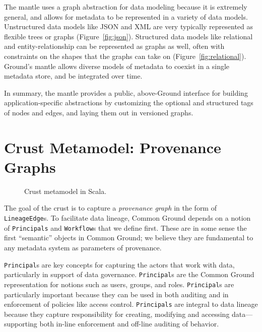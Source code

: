 \documentclass{article}
\newcommand{\mantle}{mantle\xspace}
\newcommand{\crust}{crust\xspace}
\newcommand{\Crust}{Crust\xspace}
\newcommand{\node}{\texttt{Node}\xspace}
\newcommand{\edge}{\texttt{Edge}\xspace}
\newcommand{\structure}{\texttt{Structure}\xspace}
\begin{document}
The \mantle uses a graph abstraction for data modeling because it is extremely general, and allows for metadata to be represented in a variety of 
data models.  Unstructured data models like JSON and XML 
are very typically represented as flexible trees or graphs (Figure~\ref{fig:json}).  
Structured data models like relational and entity-relationship can be represented as graphs as well, often
with constraints on the shapes that the graphs can take on (Figure~\ref{fig:relational}).  Ground's \mantle allows diverse models
of metadata to coexist in a single metadata store, and be integrated over time.

In summary, the \mantle provides a public, above-Ground interface for building application-specific 
abstractions by customizing the optional and structured tags of nodes and edges, and laying them out in versioned graphs. 



\section{\Crust Metamodel: Provenance Graphs}

\begin{figure}[ht]
\begin{scriptsize}
\begin{multicols}{2}

\end{multicols}
\end{scriptsize}
\caption{\Crust metamodel in Scala.}
\label{fig:crust}
\end{figure}
The goal of the \crust is to capture a \emph{provenance graph} in the form of
\texttt{LineageEdge}s.  To facilitate data lineage, Common Ground depends on
a notion of \texttt{Principals} and \texttt{Workflow}s that we define first.  These
are in some sense the first ``semantic'' objects in Common Ground; we believe they are fundamental
to any metadata system as parameters of provenance.

\texttt{Principal}s are key concepts for capturing the actors that work with data, particularly in support of data governance. \texttt{Principal}s are
the Common Ground representation for notions such as users, groups, and roles.
\texttt{Principal}s are particularly important
because they can be used in both auditing and
in enforcement of policies like access control.
\texttt{Principals} are integral to data lineage because
they capture responsibility for creating, modifying and accessing data---supporting
both in-line enforcement and off-line auditing of behavior.
\end{document}
